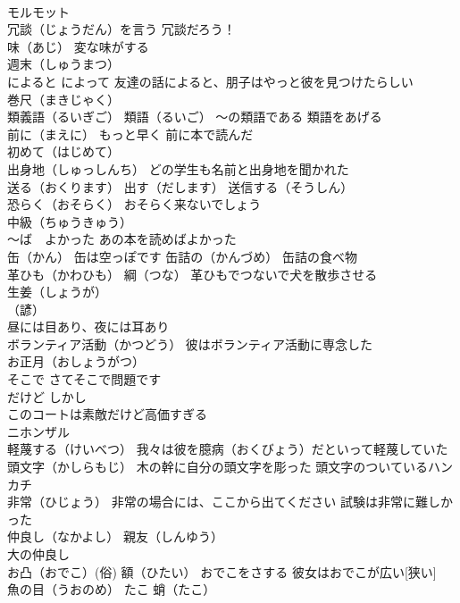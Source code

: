 \documentclass[8pt]{extreport}
\begin{document}
\begin{CJK}{UTF8}{min}
\\	モルモット
\\	冗談（じょうだん）を言う 冗談だろう！
\\	味（あじ） 変な味がする
\\	週末（しゅうまつ）
\\	によると によって 友達の話によると、朋子はやっと彼を見つけたらしい
\\	巻尺（まきじゃく）
\\	類義語（るいぎご） 類語（るいご） ～の類語である 類語をあげる
\\	前に（まえに） もっと早く 前に本で読んだ
\\	初めて（はじめて）
\\	出身地（しゅっしんち） どの学生も名前と出身地を聞かれた
\\	送る（おくります） 出す（だします） 送信する（そうしん） 
\\	恐らく（おそらく） おそらく来ないでしょう
\\	中級（ちゅうきゅう）
\\	～ば　よかった あの本を読めばよかった
\\	缶（かん） 缶は空っぽです 缶詰の（かんづめ） 缶詰の食べ物
\\	革ひも（かわひも） 綱（つな） 革ひもでつないで犬を散歩させる
\\	生姜（しょうが）
\\	（諺）
\\	昼には目あり、夜には耳あり 
\\	ボランティア活動（かつどう） 彼はボランティア活動に専念した
\\	お正月（おしょうがつ）
\\	そこで さてそこで問題です
\\	だけど しかし　
\\	このコートは素敵だけど高価すぎる
\\	ニホンザル
\\	軽蔑する（けいべつ） 我々は彼を臆病（おくびょう）だといって軽蔑していた
\\	頭文字（かしらもじ） 木の幹に自分の頭文字を彫った 頭文字のついているハンカチ
\\	非常（ひじょう） 非常の場合には、ここから出てください 試験は非常に難しかった
\\	仲良し（なかよし） 親友（しんゆう）
\\	大の仲良し
\\	お凸（おでこ）(俗) 額（ひたい） おでこをさする 彼女はおでこが広い[狭い]
\\	魚の目（うおのめ） たこ 蛸（たこ）

\end{CJK}
\end{document}

